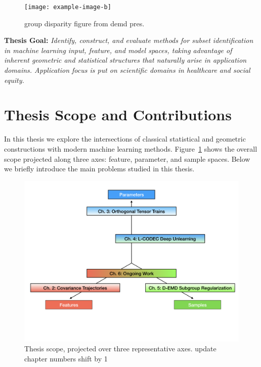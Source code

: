 \begin{figure}
    \centering
    \texttt{[image: example-image-b]}
    \caption[Equating sample subsets]{\color{red} group disparity figure from demd pres.}
\end{figure}

\begin{mdframed}[style=MyFrame]
\textbf{ Thesis Goal: }
\em Identify, construct, and evaluate methods for subset identification in machine learning input, feature, and model spaces, taking advantage of inherent geometric and statistical structures that naturally arise in application domains. 
Application focus is put on scientific domains in healthcare and social equity.
\end{mdframed}

\section{Thesis Scope and Contributions}

In this thesis we explore the intersections of classical statistical and geometric constructions with modern machine learning methods. 
Figure~\ref{fig:scope} shows the overall scope projected along three axes: feature, parameter, and sample spaces.
Below we briefly introduce the main problems studied in this thesis.
\begin{figure}[!ht]
    \centering
    \includegraphics[width=0.95\linewidth]{diss/1_intro/figs/thesis_scope.png}
    \caption[Thesis Scope]{Thesis scope, projected over three representative axes. {\color{red} update chapter numbers shift by 1}}
    \label{fig:scope}
\end{figure}

